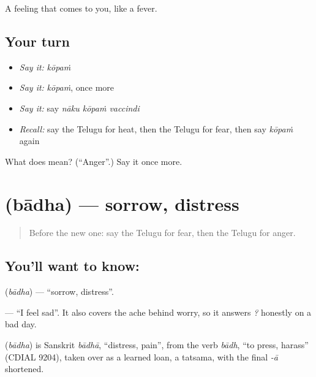\begin{grammarlens}[title={What you've built}]
A feeling that comes to you, like a fever.
\end{grammarlens}

\subsection*{Your turn}
\begin{itemize}
\raggedright
  \item \emph{Say it:} \emph{kōpaṁ}
  \item \emph{Say it:} \emph{kōpaṁ}, once more
  \item \emph{Say it:} say \emph{nāku kōpaṁ vaccindi}
  \item \emph{Recall:} say the Telugu for heat, then the Telugu for fear, then say \emph{kōpaṁ} again
\end{itemize}

\begin{tcolorbox}[breakable,colback=teal!4,colframe=teal!35!black,title={Before you move on}]
What does  mean? (\textquotedblleft{}Anger\textquotedblright{}.) Say it once more.
\end{tcolorbox}
\section[\texorpdfstring{\te{బాధ} (bādha)}{బాధ (bādha)}]{ (bādha) — sorrow, distress}

\label{lesson:TE-C85-sorrow}



\begin{quote}
Before the new one: say the Telugu for fear, then the Telugu for anger.
\end{quote}

\subsection*{You'll want to know: }
\textbf{} (\emph{bādha}) — \textquotedblleft{}sorrow, distress\textquotedblright{}.

\textbf{  } — \textquotedblleft{}I feel sad\textquotedblright{}. It also covers the ache behind worry, so it answers \emph{  ?} honestly on a bad day.

\begin{cousinweb}
\textbf{} (\emph{bādha}) is Sanskrit \emph{bādhā}, \textquotedblleft{}distress, pain\textquotedblright{}, from the verb \emph{bādh}, \textquotedblleft{}to press, harass\textquotedblright{} (CDIAL 9204), taken over as a learned loan, a tatsama, with the final \emph{-ā} shortened.
\end{cousinweb}

